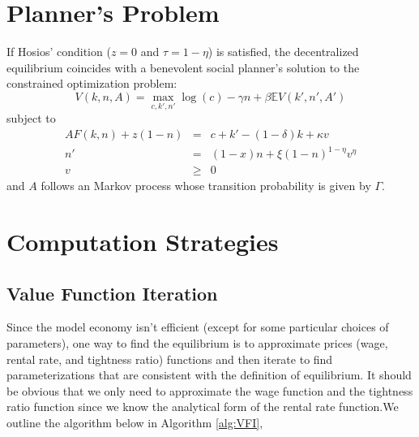 \documentclass[12pt]{article}
\begin{document}
\section{Planner's Problem}
If Hosios' condition ($z=0$ and $\tau = 1-\eta$) is satisfied, the decentralized equilibrium coincides with a benevolent social planner's solution to the constrained optimization problem:
	\begin{equation}
	V(k,n,A) = \max_{c,k',n'}  \log(c) - \gamma n+\beta \mathbb{E} V(k',n',A') 
	\end{equation}
	subject to
	\begin{eqnarray}
	A F(k,n) + z(1-n) &=&  c + k' - (1-\delta)k + \kappa v \\ 
	n' &=& (1-x)n + \xi (1-n)^{1-\eta} v^{\eta}  \\
	v &\ge& 0
	\end{eqnarray}
	and $A$ follows an Markov process whose transition probability is given by $\Gamma$.

\section{Computation Strategies}
\subsection{Value Function Iteration}
Since the model economy isn't efficient (except for some particular choices of parameters), one way to find the equilibrium is to approximate prices (wage, rental rate, and tightness ratio) functions and then iterate to find parameterizations that are consistent with the definition of equilibrium. It should be obvious that we only need to approximate the wage function and the tightness ratio function since we know the analytical form of the rental rate function.We outline the algorithm below in Algorithm \ref{alg:VFI},
\end{document}
